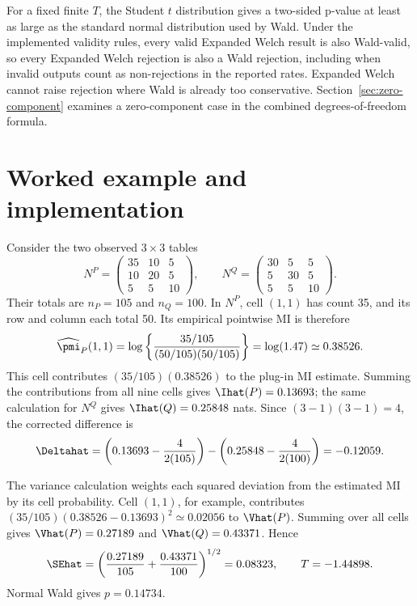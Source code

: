 For a fixed finite \(T\), the Student \(t\) distribution gives a two-sided
p-value at least as large as the standard normal distribution used by Wald.
Under the implemented validity rules, every valid Expanded Welch result is
also Wald-valid, so every Expanded Welch rejection is also a Wald
rejection, including when invalid
outputs count as non-rejections in the reported rates. Expanded Welch cannot
raise rejection where Wald is already too conservative.
Section~\ref{sec:zero-component} examines a zero-component case in the
combined degrees-of-freedom formula.

\section{Worked example and implementation}

Consider the two observed \(3\times3\) tables
\begin{equation}
  N^P=
  \begin{pmatrix}
  35&10&5\\
  10&20&5\\
  5&5&10
  \end{pmatrix},
  \qquad
  N^Q=
  \begin{pmatrix}
  30&5&5\\
  5&30&5\\
  5&5&10
  \end{pmatrix}.
  \label{eq:worked-tables}
\end{equation}
Their totals are \(n_P=105\) and \(n_Q=100\). In \(N^P\), cell
\((1,1)\) has count 35, and its row and column each total 50. Its empirical
pointwise MI is therefore
\begin{equation*}
 \widehat\pmi_P(1,1)
 =\log\left\{\frac{35/105}{(50/105)(50/105)}\right\}
 =\log(1.47)\simeq0.38526.
\end{equation*}
This cell contributes \((35/105)(0.38526)\) to the plug-in MI estimate.
Summing the contributions from all nine cells gives
\(\Ihat(P)=0.13693\); the same calculation for \(N^Q\) gives
\(\Ihat(Q)=0.25848\) nats. Since \((3-1)(3-1)=4\), the corrected difference is
\begin{equation}
  \Deltahat
  =\left(0.13693-\frac{4}{2(105)}\right)
  -\left(0.25848-\frac{4}{2(100)}\right)
  =-0.12059.
\end{equation}

The variance calculation weights each squared deviation from the estimated
MI by its cell probability. Cell \((1,1)\), for example, contributes
\((35/105)(0.38526-0.13693)^2\simeq0.02056\) to \(\Vhat(P)\).
Summing over all cells gives \(\Vhat(P)=0.27189\) and
\(\Vhat(Q)=0.43371\). Hence
\begin{equation}
  \SEhat
  =\left(\frac{0.27189}{105}+\frac{0.43371}{100}\right)^{1/2}
  =0.08323,
  \qquad
  T=-1.44898.
\end{equation}
Normal Wald gives \(p=0.14734\).

